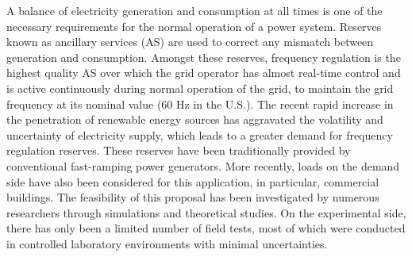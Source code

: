 \documentclass[../../thesis.tex]{subfiles}
\begin{document}
%
%


%
%


A balance of electricity generation and consumption at all times is one of the necessary requirements for the normal operation of a power system. 
Reserves known as ancillary services (AS) are used to correct any mismatch between generation and consumption.
Amongst these reserves, frequency regulation is the highest quality AS over which the grid operator has almost real-time control and is active continuously during normal operation of the grid, to maintain the grid frequency at its nominal value (60 Hz in the U.S.).
The recent rapid increase in the penetration of renewable energy sources has aggravated the volatility and uncertainty of electricity supply, which leads to a greater demand for frequency regulation reserves.
These reserves have been traditionally provided by conventional fast-ramping power generators. 
More recently, loads on the demand side have also been considered for this application, in particular, commercial buildings.
The feasibility of this proposal has been investigated by numerous researchers through simulations and theoretical studies.
On the experimental side, there has only been a limited number of field tests, most of which were conducted in controlled laboratory environments with minimal uncertainties.
\end{document}
